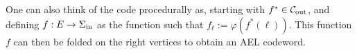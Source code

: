 One can also think of the code procedurally as, starting with $f^* \in {\mathcal C}_{\mathrm{out}}$, and defining $f : E\rightarrow \Sigma_{\mathrm{in}}$ as the function such that $f_\ell := \varphi(f^*(\ell))$. This function $f$ can then be folded on the right vertices to obtain an AEL codeword. 

%
%
%
%
%




